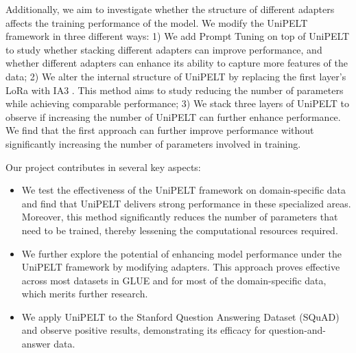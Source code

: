 \documentclass[10pt,twocolumn,letterpaper]{article}
\begin{document}
Additionally, we aim to investigate whether the structure of different adapters affects the training performance of the model. We modify the UniPELT framework in three different ways: 1) We add Prompt Tuning on top of UniPELT to study whether stacking different adapters can improve performance, and whether different adapters can enhance its ability to capture more features of the data; 2) We alter the internal structure of UniPELT by replacing the first layer's LoRa with IA3 \cite{liu2022fewshot}. This method aims to study reducing the number of parameters while achieving comparable performance; 3) We stack three layers of UniPELT to observe if increasing the number of UniPELT can further enhance performance. We find that the first approach can further improve performance without significantly increasing the number of parameters involved in training.

Our project contributes in several key aspects:
\begin{itemize}[topsep=0pt, itemsep=0pt, parsep=0pt]
    \item We test the effectiveness of the UniPELT framework on domain-specific data and find that UniPELT delivers strong performance in these specialized areas. Moreover, this method significantly reduces the number of parameters that need to be trained, thereby lessening the computational resources required.
    \item We further explore the potential of enhancing model performance under the UniPELT framework by modifying adapters. This approach proves effective across most datasets in GLUE and for most of the domain-specific data, which merits further research.
    \item We apply UniPELT to the Stanford Question Answering Dataset (SQuAD) and observe positive results, demonstrating its efficacy for question-and-answer data.
\end{itemize}
\end{document}
